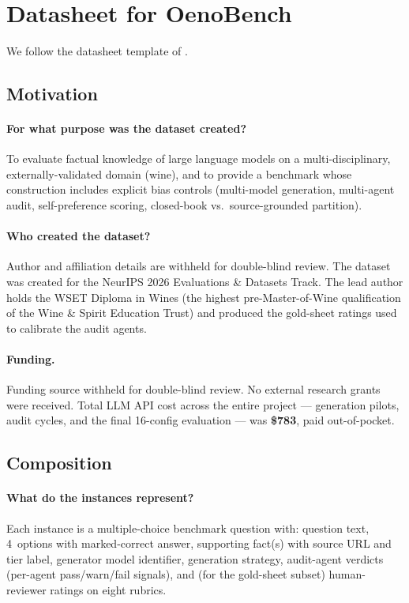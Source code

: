 \section{Datasheet for OenoBench}
\label{app:datasheet}

We follow the datasheet template of \citet{gebru2021datasheets}.

\subsection{Motivation}
\paragraph{For what purpose was the dataset created?}
To evaluate factual knowledge of large language models on a multi-disciplinary,
externally-validated domain (wine), and to provide a benchmark whose
construction includes explicit bias controls (multi-model generation,
multi-agent audit, self-preference scoring, closed-book vs.\ source-grounded
partition).

\paragraph{Who created the dataset?}
Author and affiliation details are withheld for double-blind review.
The dataset was created for the NeurIPS 2026 Evaluations \& Datasets
Track. The lead author holds the WSET Diploma in Wines (the highest
pre-Master-of-Wine qualification of the Wine \& Spirit Education
Trust) and produced the gold-sheet ratings used to calibrate the
audit agents.

\paragraph{Funding.}
Funding source withheld for double-blind review. No external research
grants were received. Total LLM API cost across the entire project
--- generation pilots, audit cycles, and the final 16-config
evaluation --- was \textbf{\$783}, paid out-of-pocket.

\subsection{Composition}
\paragraph{What do the instances represent?}
Each instance is a multiple-choice benchmark question with: question
text, 4~options with marked-correct answer, supporting fact(s) with
source URL and tier label, generator model identifier, generation
strategy, audit-agent verdicts (per-agent pass/warn/fail signals), and
(for the gold-sheet subset) human-reviewer ratings on eight rubrics.

